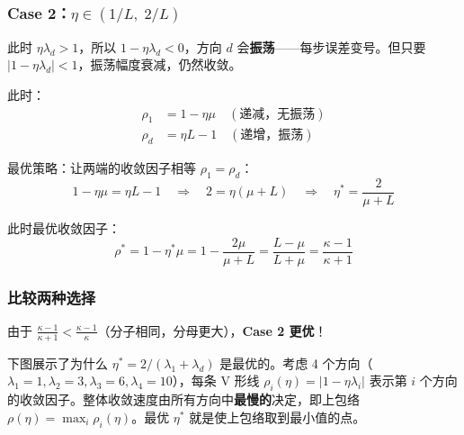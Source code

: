 \documentclass[12pt, a4paper]{ctexart}
\begin{document}
\subsubsection{Case 2：$\eta \in (1/L,\; 2/L)$}

此时 $\eta\lambda_d > 1$，所以 $1 - \eta\lambda_d < 0$，方向 $d$ 会\textbf{振荡}——每步误差变号。但只要 $|1 - \eta\lambda_d| < 1$，振荡幅度衰减，仍然收敛。

此时：
\begin{align}
    \rho_1 &= 1 - \eta\mu \quad (\text{递减，无振荡}) \\
    \rho_d &= \eta L - 1 \quad (\text{递增，振荡})
\end{align}

最优策略：让两端的收敛因子相等 $\rho_1 = \rho_d$：
\begin{equation}
    1 - \eta\mu = \eta L - 1 \quad \Rightarrow \quad 2 = \eta(\mu + L) \quad \Rightarrow \quad \eta^* = \frac{2}{\mu + L}
\end{equation}

此时最优收敛因子：
\begin{equation}
    \rho^* = 1 - \eta^*\mu = 1 - \frac{2\mu}{\mu + L} = \frac{L - \mu}{L + \mu} = \frac{\kappa - 1}{\kappa + 1}
\end{equation}

\subsubsection{比较两种选择}

由于 $\frac{\kappa - 1}{\kappa + 1} < \frac{\kappa - 1}{\kappa}$（分子相同，分母更大），\textbf{Case 2 更优}！

下图展示了为什么 $\eta^* = 2/(\lambda_1 + \lambda_d)$ 是最优的。考虑 4 个方向（$\lambda_1 = 1, \lambda_2 = 3, \lambda_3 = 6, \lambda_4 = 10$），每条 V 形线 $\rho_i(\eta) = |1 - \eta\lambda_i|$ 表示第 $i$ 个方向的收敛因子。整体收敛速度由所有方向中\textbf{最慢的}决定，即上包络 $\rho(\eta) = \max_i \rho_i(\eta)$。最优 $\eta^*$ 就是使上包络取到最小值的点。
\end{document}
